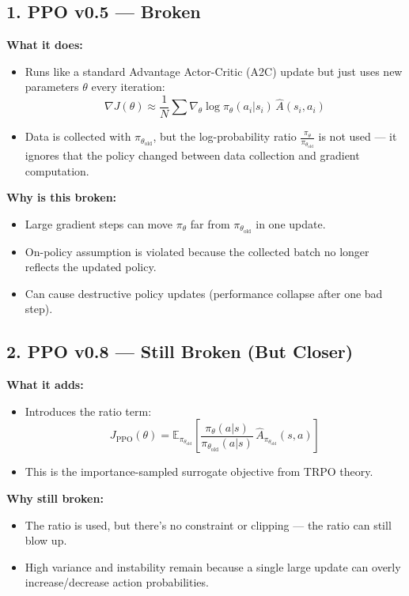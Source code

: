 \documentclass[12pt]{article}
\begin{document}
\subsection*{1. PPO v0.5 --- Broken}
\textbf{What it does:}
\begin{itemize}
    \item Runs like a standard Advantage Actor-Critic (A2C) update but just uses new parameters $\theta$ every iteration:
    \[
        \nabla J(\theta) \approx \frac{1}{N} \sum \nabla_\theta \log \pi_\theta(a_i|s_i) \, \hat{A}(s_i,a_i)
    \]
    \item Data is collected with $\pi_{\theta_{\text{old}}}$, but the log-probability ratio $\frac{\pi_\theta}{\pi_{\theta_{\text{old}}}}$ is not used --- it ignores that the policy changed between data collection and gradient computation.
\end{itemize}

\textbf{Why is this broken:}
\begin{itemize}
    \item Large gradient steps can move $\pi_\theta$ far from $\pi_{\theta_{\text{old}}}$ in one update.
    \item On-policy assumption is violated because the collected batch no longer reflects the updated policy.
    \item Can cause destructive policy updates (performance collapse after one bad step).
\end{itemize}

\subsection*{2. PPO v0.8 --- Still Broken (But Closer)}
\textbf{What it adds:}
\begin{itemize}
    \item Introduces the ratio term:
    \[
        J_{\text{PPO}}(\theta) = \mathbb{E}_{\pi_{\theta_{\text{old}}}} \left[ \frac{\pi_\theta(a|s)}{\pi_{\theta_{\text{old}}}(a|s)} \, \hat{A}_{\pi_{\theta_\text{old}}}(s,a) \right]
    \]
    \item This is the importance-sampled surrogate objective from TRPO theory.
\end{itemize}

\textbf{Why still broken:}
\begin{itemize}
    \item The ratio is used, but there’s no constraint or clipping --- the ratio can still blow up.
    \item High variance and instability remain because a single large update can overly increase/decrease action probabilities.
\end{itemize}
\end{document}

